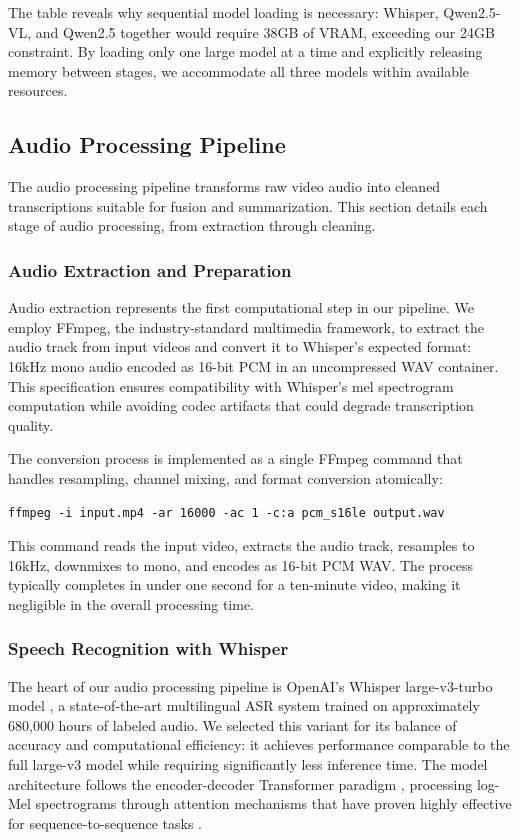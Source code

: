 The table reveals why sequential model loading is necessary: Whisper, Qwen2.5-VL, and Qwen2.5 together would require 38GB of VRAM, exceeding our 24GB constraint. By loading only one large model at a time and explicitly releasing memory between stages, we accommodate all three models within available resources.

\subsection{Audio Processing Pipeline}

The audio processing pipeline transforms raw video audio into cleaned transcriptions suitable for fusion and summarization. This section details each stage of audio processing, from extraction through cleaning.

\subsubsection{Audio Extraction and Preparation}

Audio extraction represents the first computational step in our pipeline. We employ FFmpeg, the industry-standard multimedia framework, to extract the audio track from input videos and convert it to Whisper's expected format: 16kHz mono audio encoded as 16-bit PCM in an uncompressed WAV container. This specification ensures compatibility with Whisper's mel spectrogram computation while avoiding codec artifacts that could degrade transcription quality.

The conversion process is implemented as a single FFmpeg command that handles resampling, channel mixing, and format conversion atomically:

\begin{verbatim}
ffmpeg -i input.mp4 -ar 16000 -ac 1 -c:a pcm_s16le output.wav
\end{verbatim}

This command reads the input video, extracts the audio track, resamples to 16kHz, downmixes to mono, and encodes as 16-bit PCM WAV. The process typically completes in under one second for a ten-minute video, making it negligible in the overall processing time.

\subsubsection{Speech Recognition with Whisper}

The heart of our audio processing pipeline is OpenAI's Whisper large-v3-turbo model \cite{Radford2023}, a state-of-the-art multilingual ASR system trained on approximately 680,000 hours of labeled audio. We selected this variant for its balance of accuracy and computational efficiency: it achieves performance comparable to the full large-v3 model while requiring significantly less inference time. The model architecture follows the encoder-decoder Transformer paradigm \cite{Vaswani2017}, processing log-Mel spectrograms through attention mechanisms that have proven highly effective for sequence-to-sequence tasks \cite{Sutskever2014}.

